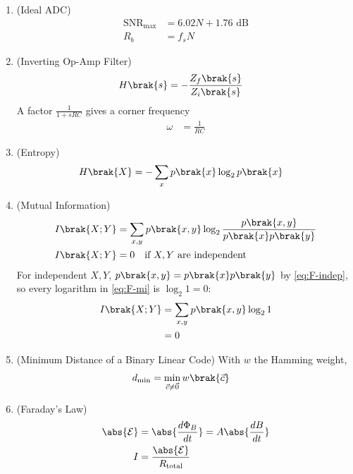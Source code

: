 \begin{enumerate}[label=\thesubsection.\arabic*, ref=\thesubsection.\theenumi, itemsep=0pt, leftmargin=0pt, labelwidth=0pt, itemindent=0pt, labelsep=1em, align=right]
\item (Ideal ADC)
\begin{align}
\mathrm{SNR}_{\max} &= 6.02 N + 1.76 \text{ dB}
\\
R_b &= f_s N
\label{eq:F-adc}
\end{align}

\item (Inverting Op-Amp Filter)
\begin{align}
H\brak{s} &= -\frac{Z_f\brak{s}}{Z_i\brak{s}}
\label{eq:F-inv}
\end{align}
A factor $\frac{1}{1 + sRC}$ gives a corner frequency
\begin{align}
\omega &= \frac{1}{RC}
\label{eq:F-corner}
\end{align}

\item (Entropy)
\begin{align}
H\brak{X} &= -\sum_{x} p\brak{x} \log_2 p\brak{x}
\label{eq:F-entropy}
\end{align}

\item (Mutual Information)
\begin{align}
I\brak{X;Y} &= \sum_{x,y} p\brak{x,y} \log_2 \frac{p\brak{x,y}}{p\brak{x}p\brak{y}}
\label{eq:F-mi}
\\
I\brak{X;Y} &= 0 \quad \text{if } X, Y \text{ are independent}
\label{eq:F-mi-zero}
\end{align}
\solution For independent $X, Y$, $p\brak{x,y} = p\brak{x}p\brak{y}$ by \eqref{eq:F-indep}, so every logarithm in \eqref{eq:F-mi} is $\log_2 1 = 0$:
\begin{align}
I\brak{X;Y} &= \sum_{x,y} p\brak{x,y} \log_2 1
\\
&= 0
\end{align}

\item (Minimum Distance of a Binary Linear Code) With $w$ the Hamming weight,
\begin{align}
d_{\min} &= \min_{\vec{c} \ne \vec{0}} w\brak{\vec{c}}
\label{eq:F-dmin}
\end{align}

\item (Faraday's Law)
\begin{align}
\abs{\mathcal{E}} &= \abs{\frac{d\Phi_B}{dt}} = A \abs{\frac{dB}{dt}}
\\
I &= \frac{\abs{\mathcal{E}}}{R_{\mathrm{total}}}
\label{eq:F-faraday}
\end{align}


\end{enumerate}
